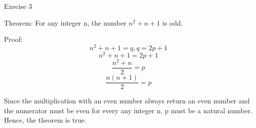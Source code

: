 \documentclass[12pt]{article}
\begin{document}
Execise 3

Theorem: For any integer n, the number $n^2+n+1$ is odd.

Proof: 
\[n^2 + n + 1 = q, q = 2p+1\]
\[n^2 + n + 1 = 2p+1\]
\[\frac{n^2 + n}{2} = p\]
\[\frac{n(n + 1)}{2} = p\]

Since the multiplication with an even number always return an even number and the numerator must be even for every any integer n, p must be a natural number. Hence, the theorem is true. 
\end{document}
